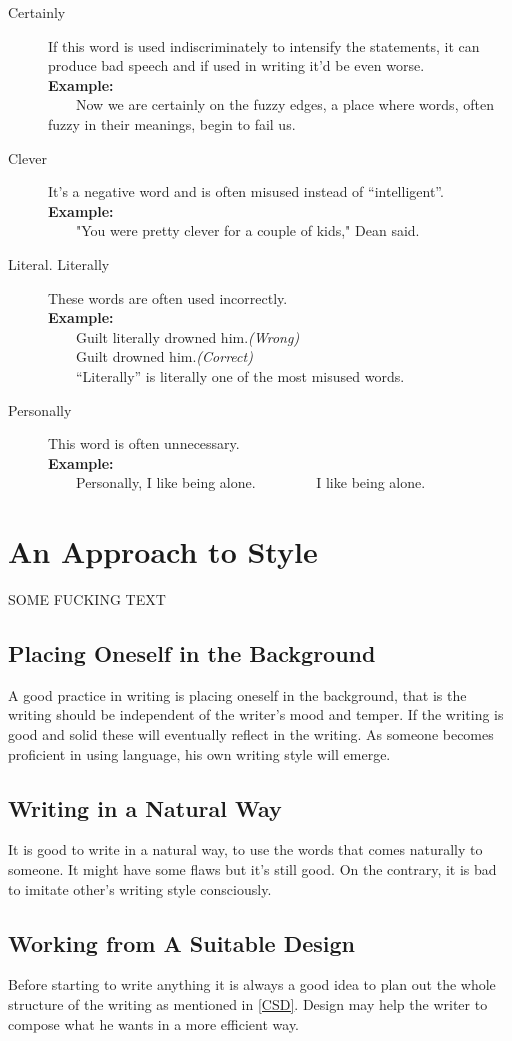 \documentclass{report}
\newcommand{\xmpl}{\textbf{Example:}\\} %
\newcommand{\indnt}{\ \ \ \ } %
\begin{document}
\begin{description}
	\item[Certainly] If this word is used indiscriminately to intensify the statements, it can produce bad speech and if used in writing it'd be even worse.\\
	\xmpl
	\indnt Now we are certainly on the fuzzy edges, a place where words, often fuzzy in their meanings, begin to fail us.
	\item[Clever] It's a negative word and is often misused instead of ``intelligent''.\\
	\xmpl
	\indnt "You were pretty clever for a couple of kids," Dean said.
	\item[Literal. Literally] These words are often used incorrectly.\\
	\xmpl
	\indnt Guilt literally drowned him.\textit{(Wrong)}\\
	\indnt Guilt drowned him.\textit{(Correct)}\\
	\indnt ``Literally'' is literally one of the most misused words.
	\item[Personally] This word is often unnecessary.\\
	\xmpl
	\indnt Personally, I like being alone. \indnt \indnt I like being alone.
\end{description}

\chapter{An Approach to Style}
SOME FUCKING TEXT
\section{Placing Oneself in the Background}
A good practice in writing is placing oneself in the background, that is the writing should be independent of the writer's mood and temper. If the writing is good and solid these will eventually reflect in the writing. As someone becomes proficient in using language, his own writing style will emerge.
\section{Writing in a Natural Way}
It is good to write in a natural way, to use the words that comes naturally to someone. It might have some flaws but it's still good. On the contrary, it is bad to imitate other's writing style consciously.
\section{Working from A Suitable Design}
Before starting to write anything it is always a good idea to plan out the whole structure of the writing as mentioned in \ref{CSD}. Design may help the writer to compose what he wants in a more efficient way.
\end{document}

